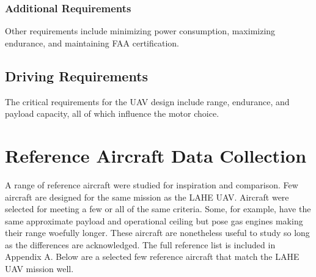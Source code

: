 \documentclass[12pt]{article}
\begin{document}
	\subsubsection{Additional Requirements}
	Other requirements include minimizing power consumption, maximizing endurance, and maintaining FAA certification.
	
	\subsection{Driving Requirements}
	The critical requirements for the UAV design include range, endurance, and payload capacity, all of which influence the motor choice.
	
	\section{Reference Aircraft Data Collection}
	A range of reference aircraft were studied for inspiration and comparison. Few aircraft are designed for the same mission as the LAHE UAV. Aircraft were selected for meeting a few or all of the same criteria. Some, for example, have the same approximate payload and operational ceiling but pose gas engines making their range woefully longer. These aircraft are nonetheless useful to study so long as the differences are acknowledged. The full reference list is included in Appendix A. Below are a selected few reference aircraft that match the LAHE UAV mission well.
	
	\newpage
	
\end{document}

